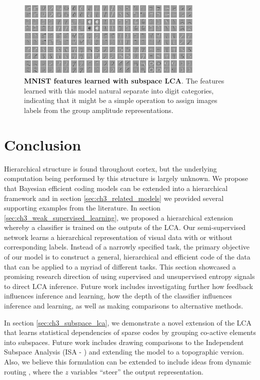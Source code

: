 \begin{figure}[h]
    \centering
    \includegraphics[width=0.8\textwidth]{figures/subspace_lca_mnist_features.png}
    \caption{\textbf{MNIST features learned with subspace LCA}. The features learned with this model natural separate into digit categories, indicating that it might be a simple operation to assign images labels from the group amplitude representations.}
    \label{fig:ch3_subspace_lca_mnist_features}
\end{figure}

\section{Conclusion}\label{sec:ch3_conclusion}
Hierarchical structure is found throughout cortex, but the underlying computation being performed by this structure is largely unknown. We propose that Bayesian efficient coding models can be extended into a hierarchical framework and in section \ref{sec:ch3_related_models} we provided several supporting examples from the literature. In section \ref{sec:ch3_weak_supervised_learning}, we proposed a hierarchical extension whereby a classifier is trained on the outputs of the LCA. Our semi-supervised network learns a hierarchical representation of visual data with or without corresponding labels. Instead of a narrowly specified task, the primary objective of our model is to construct a general, hierarchical and efficient code of the data that can be applied to a myriad of different tasks. This section showcased a promising research direction of using supervised and unsupervised entropy signals to direct LCA inference. Future work includes investigating further how feedback influences inference and learning, how the depth of the classifier influences inference and learning, as well as making comparisons to alternative methods.

In section \ref{sec:ch3_subspace_lca}, we demonstrate a novel extension of the LCA that learns statistical dependencies of sparse codes by grouping co-active elements into subspaces. Future work includes drawing comparisons to the Independent Subspace Analysis (ISA - \cite{hyvarinen2000emergence}) and extending the model to a topographic version. Also, we believe this formulation can be extended to include ideas from dynamic routing \parencite{olshausen1993neurobiological}, where the $z$ variables ``steer'' the output representation.